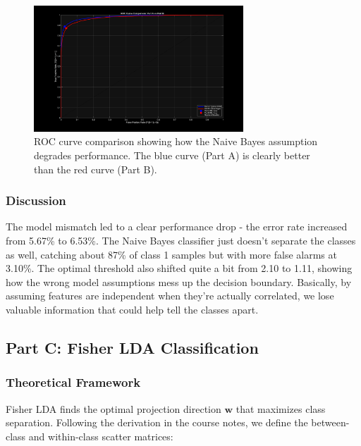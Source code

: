 \documentclass[12pt]{article}
\begin{document}
\begin{figure}[H]
    \centering
    \includegraphics[width=0.7\textwidth]{partAB_ROC_comparison.png}
    \caption{ROC curve comparison showing how the Naive Bayes assumption degrades performance. The blue curve (Part A) is clearly better than the red curve (Part B).}
\end{figure}

\subsubsection{Discussion}
The model mismatch led to a clear performance drop - the error rate increased from 5.67\% to 6.53\%. The Naive Bayes classifier just doesn't separate the classes as well, catching about 87\% of class 1 samples but with more false alarms at 3.10\%. The optimal threshold also shifted quite a bit from 2.10 to 1.11, showing how the wrong model assumptions mess up the decision boundary. Basically, by assuming features are independent when they're actually correlated, we lose valuable information that could help tell the classes apart.
\subsection{Part C: Fisher LDA Classification}

\subsubsection{Theoretical Framework}

Fisher LDA finds the optimal projection direction $\mathbf{w}$ that maximizes class separation. Following the derivation in the course notes, we define the between-class and within-class scatter matrices:
\end{document}
